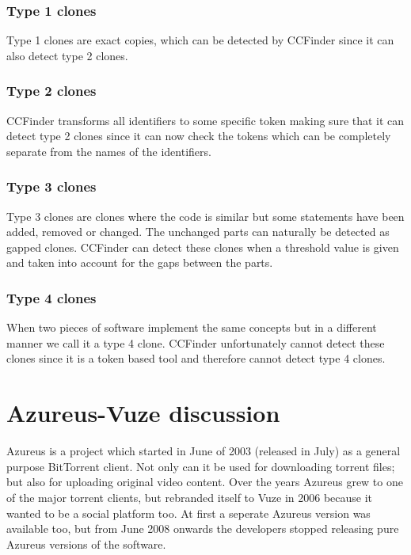 \documentclass[a4paper,twoside,11pt]{article}
\begin{document}
\subsubsection{Type 1 clones}
\label{sec:type1}
Type 1 clones are exact copies, which can be detected by CCFinder since it can also detect type 2 clones.

\subsubsection{Type 2 clones}
\label{sec:type2}
CCFinder transforms all identifiers to some specific token making sure that it can detect type 2 clones since it can now check the tokens which can be completely separate from the names of the identifiers.

\subsubsection{Type 3 clones}
\label{sec:type3}
Type 3 clones are clones where the code is similar but some statements have been added, removed or changed. The unchanged parts can naturally be detected as gapped clones. CCFinder can detect these clones when a threshold value is given and taken into account for the gaps between the parts.

\subsubsection{Type 4 clones}
\label{sec:type4}
When two pieces of software implement the same concepts but in a different manner we call it a type 4 clone. CCFinder unfortunately cannot detect these clones since it is a token based tool and therefore cannot detect type 4 clones.


\section{Azureus-Vuze discussion}
\label{sec:azureusdiscussion}
{\sc Azureus} is a project which started in June of 2003 (released in July) as a general purpose BitTorrent client. Not only can it be used for downloading torrent files; but also for uploading original video content. Over the years Azureus grew to one of the major torrent clients, but rebranded itself to {\sc Vuze} in 2006 because it wanted to be a social platform too. At first a seperate Azureus version was available too, but from June 2008 onwards the developers stopped releasing pure Azureus versions of the software.  \\
\end{document}
